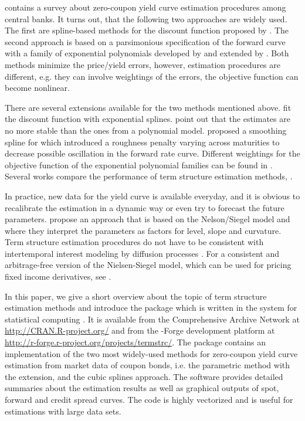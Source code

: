 \cite{BIS2005} contains a survey about zero-coupon yield curve estimation procedures among central banks. It turns out, that the following two approaches are widely used. The first are spline-based methods for the discount function proposed by \cite{McCulloch1971, McCulloch1975}. The second approach is based on a parsimonious specification of the forward curve with a family of exponential polynomials developed by \cite{Nelson1987} and extended by \cite{Svensson1994}. Both methods minimize the price/yield errors, however, estimation procedures are different, e.g. they can involve weightings of the errors, the objective function can become nonlinear.

There are several extensions available for the two methods mentioned above. \cite{Vasicek1982} fit the discount function with exponential splines. \cite{Shea1985} point out that the estimates are no more stable than the ones from a polynomial model. \cite{Fisher1995} proposed a smoothing spline for which \cite{Waggoner1997} introduced a roughness penalty varying across maturities to decrease possible oscillation in the forward rate curve. Different weightings for the objective function of the exponential polynomial families can be found in \cite{Soederlind1997}. Several works compare the performance of term structure estimation methods, \citep[see, e.g.][]{Bliss1997, Bolder1999, Ioannides2003}.

In practice, new data for the yield curve is available everyday, and it is obvious to recalibrate the estimation in a dynamic way or even try to forecast the future parameters. \cite{Diebold2006} propose an approach that is based on the Nelson/Siegel model and where they interpret the parameters as factors for level, slope and curvature. Term structure estimation procedures do not have to be consistent with intertemporal interest modeling by diffusion processes \citep[see, e.g.][]{Bjoerk1999, Filipovic1999}. For a consistent and arbitrage-free version of the Nielsen-Siegel model, which can be used for pricing fixed income derivatives, see \cite{Christensen2007}.   

In this paper, we give a short overview about the topic of term structure estimation methods and introduce the package  which is written in the  system for statistical computing \citep{R2008}. It is available from the Comprehensive  Archive Network at \url{http://CRAN.R-project.org/} and from the -Forge development platform at \url{http://r-forge.r-project.org/projects/termstrc/}. The package contains an implementation of the two most widely-used methods for zero-coupon yield curve estimation from market data of coupon bonds, i.e. the parametric \cite{Nelson1987} method with the \cite{Svensson1994} extension, and the \cite{McCulloch1975} cubic splines approach. The software provides detailed summaries about the estimation results as well as graphical outputs of spot, forward and credit spread curves. The code is highly vectorized and is useful for estimations with large data sets.

